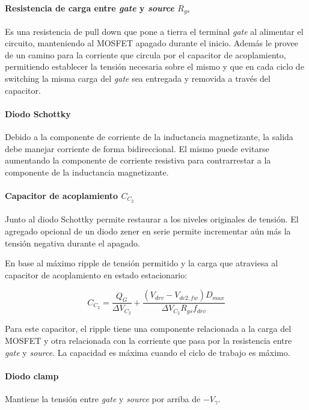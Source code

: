 \paragraph{Resistencia de carga entre \textit{gate} y \textit{source} $R_{gs}$}

Es una resistencia de pull down que pone a tierra el terminal \textit{gate} al alimentar el circuito, manteniendo al MOSFET apagado durante el inicio. 
Además le provee de un camino para la corriente que circula por el capacitor de acoplamiento, 
permitiendo establecer la tensión necesaria sobre el mismo y que en cada ciclo de switching 
la misma carga del \textit{gate} sea entregada y removida a través del capacitor. 

\paragraph{Diodo Schottky}

Debido a la componente de corriente de la inductancia magnetizante, la salida debe manejar corriente de forma bidireccional. 
El mismo puede evitarse aumentando la componente de corriente resistiva para contrarrestar a la componente de la inductancia magnetizante. 

\paragraph{Capacitor de acoplamiento $C_{C_2}$}

Junto al diodo Schottky permite restaurar a los niveles originales de tensión. 
El agregado opcional de un diodo zener en serie permite incrementar aún más la tensión negativa durante el apagado. 

En base al máximo ripple de tensión permitido y la carga que atraviesa al capacitor de acoplamiento en estado estacionario:

$$ C_{C_2}=\frac{Q_G}{\Delta V_{C_2}}+\frac{(V_{drv}-V_{dc2,fw})D_{max}}{\Delta V_{C_2}R_{gs}f_{drv}} $$

Para este capacitor, el ripple tiene una componente relacionada a la carga del MOSFET 
y otra relacionada con la corriente que pasa por la resistencia entre \textit{gate} y \textit{source}. 
La capacidad es máxima cuando el ciclo de trabajo es máximo. 

\paragraph{Diodo clamp}

Mantiene la tensión entre \textit{gate} y \textit{source} por arriba de $-V_\gamma$.\\

